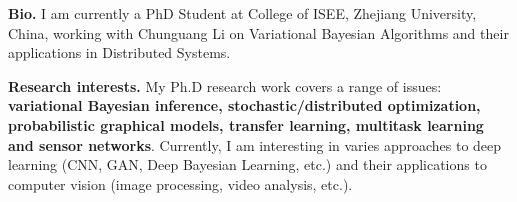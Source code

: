 %
%

\par{
{\textbf{Bio.}} 
I am currently a PhD Student at College of ISEE, Zhejiang University, China, 
 working with Chunguang Li on Variational Bayesian Algorithms and their applications in Distributed Systems. 

{\textbf{Research interests.}} 
My Ph.D research work covers a range of issues: \textbf{variational Bayesian inference, 
stochastic/distributed optimization, probabilistic graphical models, transfer learning, multitask learning 
and sensor networks}. Currently, I am interesting in varies approaches to deep learning (CNN, GAN, Deep Bayesian Learning, etc.) 
and their applications to computer vision (image processing, video analysis, etc.).  
}